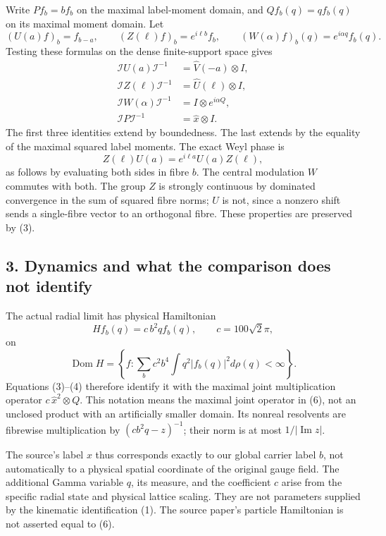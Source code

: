\documentclass[
  11pt,
]{article}
\begin{document}
Write \(P f_b=b f_b\) on the maximal label-moment domain, and
\(Qf_b(q)=qf_b(q)\) on its maximal moment domain. Let \[
 (U(a)f)_b=f_{b-a},\qquad
 (Z(\ell)f)_b=e^{i\ell b}f_b,\qquad
 (W(\alpha)f)_b(q)=e^{i\alpha q}f_b(q).
\] Testing these formulas on the dense finite-support space gives \[
 \begin{split}
 \mathcal I U(a)\mathcal I^{-1}
   &=\widehat V(-a)\otimes I,\\
 \mathcal I Z(\ell)\mathcal I^{-1}
   &=\widehat U(\ell)\otimes I,\\
 \mathcal I W(\alpha)\mathcal I^{-1}
   &=I\otimes e^{i\alpha Q},\\
 \mathcal I P\mathcal I^{-1}
   &=\widehat x\otimes I .
 \end{split}
 \tag{4}
\] The first three identities extend by boundedness. The last extends by
the equality of the maximal squared label moments. The exact Weyl phase
is \[
 Z(\ell)U(a)=e^{i\ell a}U(a)Z(\ell),
 \tag{5}
\] as follows by evaluating both sides in fibre \(b\). The central
modulation \(W\) commutes with both. The group \(Z\) is strongly
continuous by dominated convergence in the sum of squared fibre norms;
\(U\) is not, since a nonzero shift sends a single-fibre vector to an
orthogonal fibre. These properties are preserved by (3).

\subsection{3. Dynamics and what the comparison does not
identify}\label{weak-coupling-part-8-dynamics-and-what-the-comparison-does-not-identify}

The actual radial limit has physical Hamiltonian \[
 Hf_b(q)=c\,b^2q f_b(q),\qquad c=100\sqrt2\pi,
\] on \[
 \operatorname{Dom}H=
 \left\{f:\sum_b c^2b^4\int q^2|f_b(q)|^2d\rho(q)<\infty\right\}.
 \tag{6}
\] Equations (3)--(4) therefore identify it with the maximal joint
multiplication operator \(c\,\widehat x^2\otimes Q\). This notation
means the maximal joint operator in (6), not an unclosed product with an
artificially smaller domain. Its nonreal resolvents are fibrewise
multiplication by \((cb^2q-z)^{-1}\); their norm is at most
\(1/|\operatorname{Im}z|\).

The source's label \(x\) thus corresponds exactly to our global carrier
label \(b\), not automatically to a physical spatial coordinate of the
original gauge field. The additional Gamma variable \(q\), its measure,
and the coefficient \(c\) arise from the specific radial state and
physical lattice scaling. They are not parameters supplied by the
kinematic identification (1). The source paper's particle Hamiltonian is
not asserted equal to (6).
\end{document}
